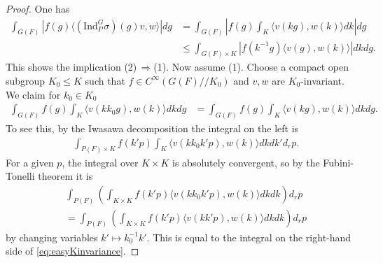 \documentclass[10pt]{amsart}
\theoremstyle{definition}
\numberwithin{equation}{section}
\numberwithin{equation}{subsection}
\newcommand{\Ind}{\mathrm{Ind}}
\begin{document}
\begin{proof} One has
\begin{align*}
    \int_{G(F)} \left|f(g) \langle (\Ind_P^G\sigma)(g)v,w\rangle\right| dg &= \int_{G(F)} \left|f(g) \int_K \langle v(kg),w(k)\rangle dk\right| dg\\
    &\leq \int_{G(F)\times K} \left|f(k^{-1}g) \langle v(g),w(k)\rangle\right| dk dg.
\end{align*}
This shows the implication (2)$\,\Rightarrow$(1). Now assume (1). Choose a compact open subgroup $K_0\le K$ such that $f\in C^\infty(G(F)/\!/K_0)$ and $v,w$ are $K_0$-invariant. We claim for $k_0\in K_0$
\begin{align}\label{eq:easyKinvariance}
    \int_{G(F)} f(g) \int_K \langle v(kk_0g),w(k)\rangle dk dg &= \int_{G(F)} f(g)\int_K  \langle v(kg),w(k)\rangle dkdg.
\end{align}
To see this, by the Iwasawa decomposition 
the integral on the left is
\begin{align*}
    &\int_{P(F)\times K} f(k'p) \int_{K} \langle v(kk_0k'p),w(k)\rangle dkdk'd_r p.
\end{align*}
For a given $p$, the integral over $K\times K$ is absolutely convergent, so by the Fubini-Tonelli theorem it is
\begin{align*}
    &\int_{P(F)}\left(\int_{K\times K} f(k'p)  \langle v(kk_0k'p),w(k)\rangle dk dk\right)d_r p\\
    &=\int_{P(F)}\left(\int_{K\times K} f(k'p)  \langle v(kk'p),w(k)\rangle dk dk\right)d_r p
\end{align*}
by changing variables $k'\mapsto k_0^{-1}k'$. This is equal to the integral on the right-hand side of \eqref{eq:easyKinvariance}.


\end{proof}
\end{document}
